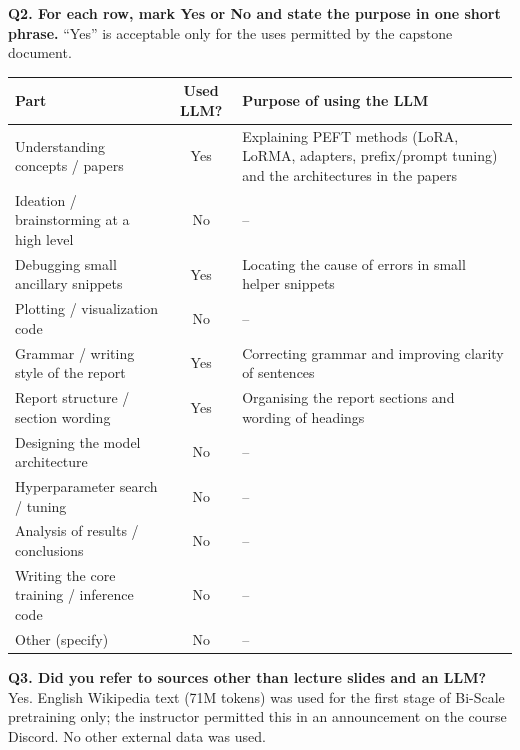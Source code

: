 \documentclass[11pt]{article}
\begin{document}
\medskip\noindent\textbf{Q2. For each row, mark Yes or No and state the purpose in one short phrase.} ``Yes'' is acceptable only for the uses permitted by the capstone document.
\begin{table}[H]
\centering\small
\begin{tabular}{>{\raggedright\arraybackslash}p{4.6cm}c>{\raggedright\arraybackslash}p{8.2cm}}
\toprule
\textbf{Part} & \textbf{Used LLM?} & \textbf{Purpose of using the LLM} \\
\midrule
Understanding concepts / papers & Yes & Explaining PEFT methods (LoRA, LoRMA, adapters, prefix/prompt tuning) and the architectures in the papers \\
Ideation / brainstorming at a high level & No & -- \\
Debugging small ancillary snippets & Yes & Locating the cause of errors in small helper snippets \\
Plotting / visualization code & No & -- \\
Grammar / writing style of the report & Yes & Correcting grammar and improving clarity of sentences \\
Report structure / section wording & Yes & Organising the report sections and wording of headings \\
Designing the model architecture & No & -- \\
Hyperparameter search / tuning & No & -- \\
Analysis of results / conclusions & No & -- \\
Writing the core training / inference code & No & -- \\
Other (specify) & No & -- \\
\bottomrule
\end{tabular}
\end{table}

\medskip\noindent\textbf{Q3. Did you refer to sources other than lecture slides and an LLM?} Yes. English Wikipedia text \cite{wikipedia} (71M tokens) was used for the first stage of Bi-Scale pretraining only; the instructor permitted this in an announcement on the course Discord. No other external data was used.
\end{document}
